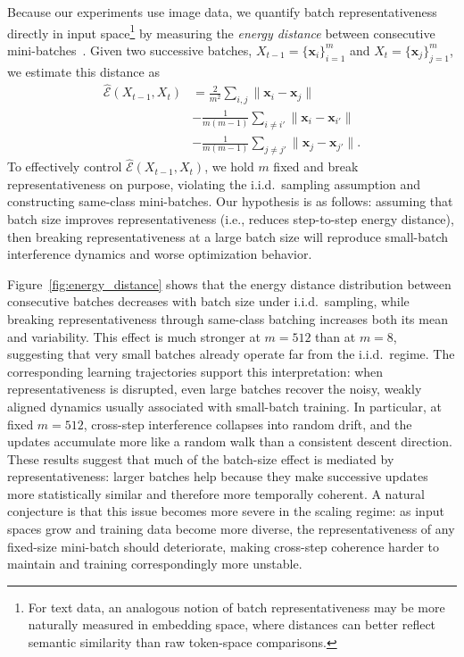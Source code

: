 Because our experiments use image data, we quantify batch representativeness directly in input space\footnote{For text data, an analogous notion of batch representativeness may be more naturally measured in embedding space, where distances can better reflect semantic similarity than raw token-space comparisons.} by measuring the \emph{energy distance} between consecutive mini-batches~\cite{szekely2013energy}. Given two successive batches, \(X_{t-1}=\{\mathbf{x}_i\}_{i=1}^{m}\) and \(X_t=\{\mathbf{x}_j\}_{j=1}^{m}\), we estimate this distance as
\begin{equation}
\begin{aligned}
\widehat{\mathcal{E}}(X_{t-1},X_t)
&=
\frac{2}{m^2}\sum_{i,j}\|\mathbf{x}_i-\mathbf{x}_j\| \\
&
-
\frac{1}{m(m-1)}\sum_{i\neq i'}\|\mathbf{x}_i-\mathbf{x}_{i'}\| \\
&
-
\frac{1}{m(m-1)}\sum_{j\neq j'}\|\mathbf{x}_j-\mathbf{x}_{j'}\|.
\end{aligned}
\label{eq:energy-sample}
\end{equation}
To effectively control \(\widehat{\mathcal{E}}(X_{t-1},X_t)\), we hold \(m\) fixed and break representativeness on purpose, violating the i.i.d.\ sampling assumption and constructing same-class mini-batches. Our hypothesis is as follows: assuming that batch size improves representativeness (i.e., reduces step-to-step energy distance), then breaking representativeness at a large batch size will reproduce small-batch interference dynamics and worse optimization behavior.

Figure~\ref{fig:energy_distance} shows that the energy distance distribution between consecutive batches decreases with batch size under i.i.d.\ sampling, while breaking representativeness through same-class batching increases both its mean and variability. This effect is much stronger at \(m=512\) than at \(m=8\), suggesting that very small batches already operate far from the i.i.d.\ regime. The corresponding learning trajectories support this interpretation: when representativeness is disrupted, even large batches recover the noisy, weakly aligned dynamics usually associated with small-batch training. In particular, at fixed \(m=512\), cross-step interference collapses into random drift, and the updates accumulate more like a random walk than a consistent descent direction. These results suggest that much of the batch-size effect is mediated by representativeness: larger batches help because they make successive updates more statistically similar and therefore more temporally coherent. A natural conjecture is that this issue becomes more severe in the scaling regime: as input spaces grow and training data become more diverse, the representativeness of any fixed-size mini-batch should deteriorate, making cross-step coherence harder to maintain and training correspondingly more unstable.




